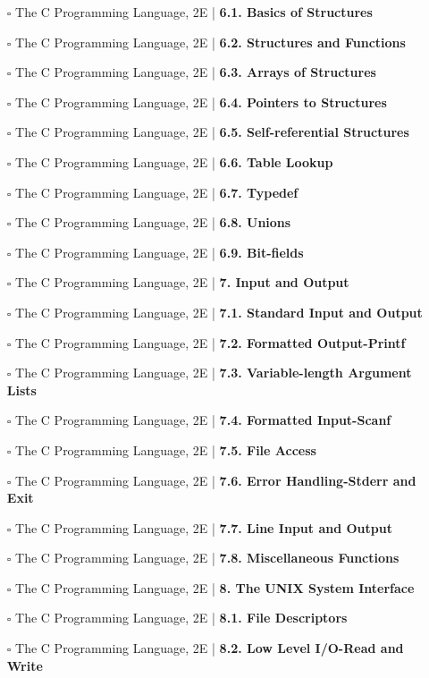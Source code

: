 \documentclass[a4, landscape, 12pt]{article}
\newcommand{\checkbox}{$\square$}%
\begin{document}
\begin{itemize}
{}
\item [\checkbox]  The C Programming Language, 2E | \textbf{ 6.1. Basics of Structures
}
\item [\checkbox]  The C Programming Language, 2E | \textbf{ 6.2. Structures and Functions
}
\item [\checkbox]  The C Programming Language, 2E | \textbf{ 6.3. Arrays of Structures
}
\item [\checkbox]  The C Programming Language, 2E | \textbf{ 6.4. Pointers to Structures
}
\item [\checkbox]  The C Programming Language, 2E | \textbf{ 6.5. Self-referential Structures
}
\item [\checkbox]  The C Programming Language, 2E | \textbf{ 6.6. Table Lookup
}
\item [\checkbox]  The C Programming Language, 2E | \textbf{ 6.7. Typedef
}
\item [\checkbox]  The C Programming Language, 2E | \textbf{ 6.8. Unions
}
\item [\checkbox]  The C Programming Language, 2E | \textbf{ 6.9. Bit-fields
}
\item [\checkbox]  The C Programming Language, 2E | \textbf{ 7. Input and Output
}
\item [\checkbox]  The C Programming Language, 2E | \textbf{ 7.1. Standard Input and Output
}
\item [\checkbox]  The C Programming Language, 2E | \textbf{ 7.2. Formatted Output-Printf
}
\item [\checkbox]  The C Programming Language, 2E | \textbf{ 7.3. Variable-length Argument Lists
}
\item [\checkbox]  The C Programming Language, 2E | \textbf{ 7.4. Formatted Input-Scanf
}
\item [\checkbox]  The C Programming Language, 2E | \textbf{ 7.5. File Access
}
\item [\checkbox]  The C Programming Language, 2E | \textbf{ 7.6. Error Handling-Stderr and Exit
}
\item [\checkbox]  The C Programming Language, 2E | \textbf{ 7.7. Line Input and Output
}
\item [\checkbox]  The C Programming Language, 2E | \textbf{ 7.8. Miscellaneous Functions
}
\item [\checkbox]  The C Programming Language, 2E | \textbf{ 8. The UNIX System Interface
}
\item [\checkbox]  The C Programming Language, 2E | \textbf{ 8.1. File Descriptors
}
\item [\checkbox]  The C Programming Language, 2E | \textbf{ 8.2. Low Level I/O-Read and Write
}
\end{itemize}
\end{document}
